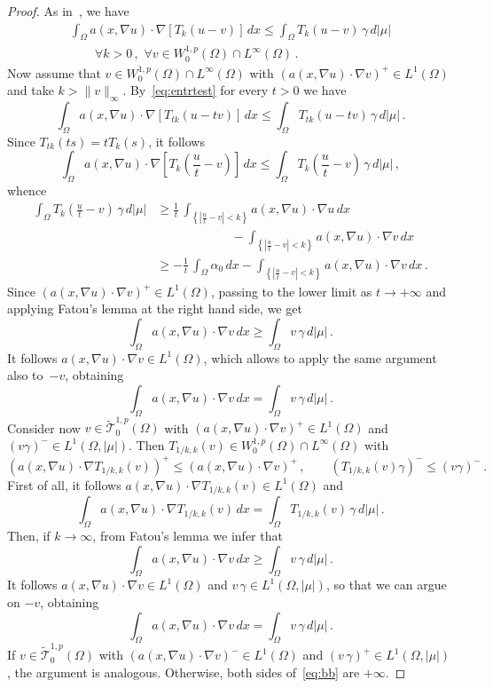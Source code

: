 \documentclass[twoside,reqno]{amsart}
\numberwithin{equation}{section}
\theoremstyle{definition}
\begin{document}
\begin{proof}
As 
in~\cite[Lemma~3.3]{benilan_boccardo_gallouet_gariepy_pierre_vazquez1995},
we have
\begin{multline}
\label{eq:entrtest}
\int_\Omega a(x,\nabla u)\cdot\nabla [T_k(u - v)]\,dx
\leq \int_\Omega T_k(u - v)\,\gamma\,d|\mu| \\
\qquad\forall k>0\,,\,\, 
\forall v\in W^{1,p}_0(\Omega)\cap L^\infty(\Omega)\,.
\end{multline}
Now assume that 
$v\in W^{1,p}_0(\Omega)\cap L^\infty(\Omega)$
with $(a(x,\nabla u)\cdot\nabla v)^+\in L^1(\Omega)$
and take $k>\|v\|_\infty$.
By~\eqref{eq:entrtest} for every $t>0$ we have
\[
\int_{\Omega} a(x,\nabla u) \cdot \nabla [T_{tk}(u-tv)]\,dx
\leq
\int_{\Omega} T_{tk}(u-tv)\,\gamma\,d|\mu|\,.
\]
Since $T_{tk}(ts) = tT_{k}(s)$, it follows
\[
\int_{\Omega} a(x,\nabla u) \cdot 
\nabla \left[T_{k}\left(\frac{u}{t}-v\right)\right]\,dx
\leq
\int_{\Omega} T_{k}\left(\frac{u}{t} - v\right)\,\gamma\,d|\mu|\,,
\]
whence
\[
\begin{split}
\int_{\Omega} T_{k}\left(\frac{u}{t} - v\right)\,\gamma\,d|\mu| 
&\geq
\frac{1}{t}\,\int_{\left\{\left|\frac{u}{t}-v\right|<k\right\}} 
a(x,\nabla u) \cdot \nabla u\,dx \\
&\qquad\qquad\qquad
- \int_{\left\{\left|\frac{u}{t}-v\right|<k\right\}} 
a(x,\nabla u) \cdot \nabla v\,dx \\
&\geq
- \frac{1}{t}\,\int_{\Omega} \alpha_0\,dx -
\int_{\left\{\left|\frac{u}{t}-v\right|<k\right\}} 
a(x,\nabla u) \cdot \nabla v\,dx\,.
\end{split}
\]
Since $(a(x,\nabla u)\cdot\nabla v)^+\in L^1(\Omega)$, passing 
to the lower limit as $t\to+\infty$ and applying Fatou's lemma 
at the right hand side, we get
\[
\int_{\Omega} a(x,\nabla u) \cdot \nabla v\,dx
\geq
\int_{\Omega} v\,\gamma\,d|\mu|\,.
\]
It follows $a(x,\nabla u)\cdot\nabla v \in L^1(\Omega)$,
which allows to apply the same argument also to~$-v$,
obtaining
\[
\int_{\Omega} a(x,\nabla u) \cdot \nabla v\,dx
=
\int_{\Omega} v\,\gamma\,d|\mu|\,.
\]
\indent
Consider now 
$v\in \widetilde{\mathcal{T}}^{1,p}_0(\Omega)$
with $(a(x,\nabla u)\cdot\nabla v)^+\in L^1(\Omega)$
and $(v \gamma)^- \in L^1(\Omega,|\mu|)$.
Then $T_{1/k,k}(v)\in W^{1,p}_0(\Omega)\cap L^\infty(\Omega)$
with
\[
(a(x,\nabla u)\cdot\nabla T_{1/k,k}(v))^+ \leq
(a(x,\nabla u)\cdot\nabla v)^+\,,\qquad
(T_{1/k,k}(v) \gamma )^- \leq (v\gamma)^-\,.
\]
First of all, it follows
$a(x,\nabla u)\cdot\nabla T_{1/k,k}(v) \in L^1(\Omega)$ and
\[
\int_{\Omega} a(x,\nabla u) \cdot \nabla T_{1/k,k}(v)\,dx
=
\int_{\Omega} T_{1/k,k}(v) \,\gamma\,d|\mu|\,.
\]
Then, if $k\to \infty$, from Fatou's lemma we infer that
\[
\int_{\Omega} a(x,\nabla u) \cdot \nabla v\,dx
\geq
\int_{\Omega} v\,\gamma\,d|\mu|\,.
\]
It follows $a(x,\nabla u)\cdot\nabla v\in L^1(\Omega)$
and $v\,\gamma \in L^1(\Omega,|\mu|)$, so that we can argue on
$-v$, obtaining
\[
\int_{\Omega} a(x,\nabla u) \cdot \nabla v\,dx
=
\int_{\Omega} v\,\gamma\,d|\mu|\,.
\]
\indent
If $v\in \widetilde{\mathcal{T}}^{1,p}_0(\Omega)$ with 
$(a(x,\nabla u)\cdot\nabla v)^-\in L^1(\Omega)$
and $(v\,\gamma)^+ \in L^1(\Omega,|\mu|)$, the argument is 
analogous.
Otherwise, both sides of~\eqref{eq:bb} are $+\infty$.
\end{proof}
\end{document}
